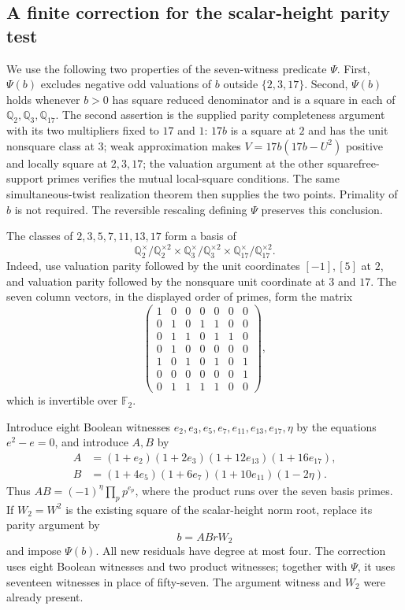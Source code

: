 \subsection{A finite correction for the scalar-height parity test}
\label{subsec:finite-parity-correction}

We use the following two properties of the seven-witness predicate
$\Psi$. First, $\Psi(b)$ excludes negative odd valuations of $b$
outside $\{2,3,17\}$. Second, $\Psi(b)$ holds whenever $b>0$ has
square reduced denominator and is a square in each of
$\mathbb Q_2,\mathbb Q_3,\mathbb Q_{17}$. The second assertion is
the supplied parity completeness argument with its two multipliers
fixed to $17$ and $1$: $17b$ is a square at $2$ and has the unit
nonsquare class at $3$; weak approximation makes
$V=17b(17b-U^2)$ positive and locally square at $2,3,17$; the
valuation argument at the other squarefree-support primes verifies
the mutual local-square conditions. The same simultaneous-twist
realization theorem then supplies the two points. Primality of $b$
is not required. The reversible rescaling defining $\Psi$
preserves this conclusion.

The classes of $2,3,5,7,11,13,17$ form a basis of
\[
 \mathbb Q_2^\times/\mathbb Q_2^{\times2}\times
 \mathbb Q_3^\times/\mathbb Q_3^{\times2}\times
 \mathbb Q_{17}^\times/\mathbb Q_{17}^{\times2}.
\]
Indeed, use valuation parity followed by the unit coordinates
$[-1],[5]$ at $2$, and valuation parity followed by the nonsquare
unit coordinate at $3$ and $17$. The seven column vectors, in the
displayed order of primes, form the matrix
\[
 \begin{pmatrix}
 1&0&0&0&0&0&0\\
 0&1&0&1&1&0&0\\
 0&1&1&0&1&1&0\\
 0&1&0&0&0&0&0\\
 1&0&1&0&1&0&1\\
 0&0&0&0&0&0&1\\
 0&1&1&1&1&0&0
 \end{pmatrix},
\]
which is invertible over $\mathbb F_2$.

Introduce eight Boolean witnesses
$e_2,e_3,e_5,e_7,e_{11},e_{13},e_{17},\eta$ by the equations
$e^2-e=0$, and introduce $A,B$ by
\begin{align*}
 A&=(1+e_2)(1+2e_3)(1+12e_{13})(1+16e_{17}),\\
 B&=(1+4e_5)(1+6e_7)(1+10e_{11})(1-2\eta).
\end{align*}
Thus $AB=(-1)^\eta\prod_p p^{e_p}$, where the product runs over
the seven basis primes. If $W_2=W^2$ is the existing square of
the scalar-height norm root, replace its parity argument by
\[
                         b=ABrW_2
\]
and impose $\Psi(b)$. All new residuals have degree at most four.
The correction uses eight Boolean witnesses and two product
witnesses; together with $\Psi$, it uses seventeen witnesses
in place of fifty-seven. The argument witness and $W_2$ were
already present.

